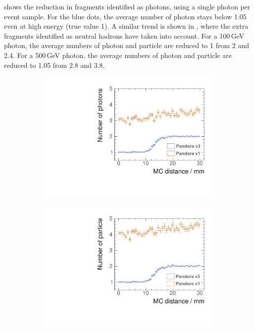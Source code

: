  shows the reduction in fragments identified as photons, using a single photon per event sample. For the blue dots, the average number of photon stays below 1.05 even at high energy (true value 1). A similar trend is shown in , where the extra fragments identified as neutral hadrons have taken into account. For a 100\,GeV photon, the average numbers of photon and particle are reduced to 1 from 2 and 2.4. For a 500\,GeV photon, the average numbers of photon and particle are reduced to 1.05 from 2.8 and 3.8.

\begin{figure}[tbph]
\centering
    \begin{subfigure}[b]{0.45\textwidth}
        \includegraphics[width=\textwidth]{photon/DoubleCompareN_p3edit.pdf}
        \caption{}
        \label{fig:photonDoubleCompareN_p}
    \end{subfigure}
    \begin{subfigure}[b]{0.45\textwidth}
        \includegraphics[width=\textwidth]{photon/DoubleCompareN_all2edit.pdf}

\end{subfigure}
\end{figure}

